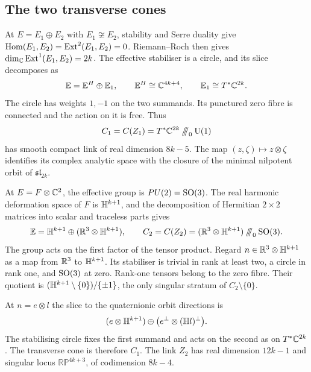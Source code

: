 \subsection{The two transverse cones}
At $E=E_1\oplus E_2$ with $E_1\not\cong E_2$, stability and Serre
duality give $\operatorname{Hom}(E_1,E_2)=\operatorname{Ext}^2(E_1,E_2)=0$. Riemann--Roch
then gives $\dim_{\mathbb C}\operatorname{Ext}^1(E_1,E_2)=2k$. The effective
stabiliser is a circle, and its slice decomposes as
\[
 \mathbb E=\mathbb E^H\oplus\mathbb E_1,
 \qquad \mathbb E^H\cong\mathbb C^{4k+4},\qquad
 \mathbb E_1\cong T^*\mathbb C^{2k}.
\]
The circle has weights $1,-1$ on the two summands. Its punctured
zero fibre is connected and the action on it is free. Thus
\begin{equation}\label{eq:C1}
 C_1=C(Z_1)=T^*\mathbb C^{2k}\mathbin{/\!\!/\!\!/}_0\operatorname{U}(1)
\end{equation}
has smooth compact link of real dimension $8k-5$. The map
$(z,\zeta)\mapsto z\otimes\zeta$ identifies its complex analytic
space with the closure of the minimal nilpotent orbit of
$\mathfrak{sl}_{2k}$.

At $E=F\otimes\mathbb C^2$, the effective group is $PU(2)=\operatorname{SO}(3)$.
The real harmonic deformation space of $F$ is $\mathbb H^{k+1}$, and
the decomposition of Hermitian $2\times2$ matrices into scalar
and traceless parts gives
\begin{equation}\label{eq:C2}
 \mathbb E=\mathbb H^{k+1}\oplus(\mathbb R^3\otimes\mathbb H^{k+1}),\qquad
 C_2=C(Z_2)=(\mathbb R^3\otimes\mathbb H^{k+1})\mathbin{/\!\!/\!\!/}_0\operatorname{SO}(3).
\end{equation}
The group acts on the first factor of the tensor product. Regard
$n\in\mathbb R^3\otimes\mathbb H^{k+1}$ as a map from $\mathbb R^3$ to
$\mathbb H^{k+1}$. Its stabiliser is trivial in rank at least two,
a circle in rank one, and $\operatorname{SO}(3)$ at zero. Rank-one tensors
belong to the zero fibre. Their quotient is
$(\mathbb H^{k+1}\setminus\{0\})/\{\pm1\}$, the only singular
stratum of $C_2\setminus\{0\}$.

At $n=e\otimes l$ the slice to the quaternionic orbit directions is
\begin{equation}\label{eq:rank-one-slice}
 (e\otimes\mathbb H^{k+1})\oplus
 \big(e^\perp\otimes(\mathbb H l)^\perp\big).
\end{equation}
The stabilising circle fixes the first summand and acts on the
second as on $T^*\mathbb C^{2k}$. The transverse cone is therefore $C_1$.
The link $Z_2$ has real dimension $12k-1$ and singular locus
$\mathbb{RP}^{4k+3}$, of codimension $8k-4$.


